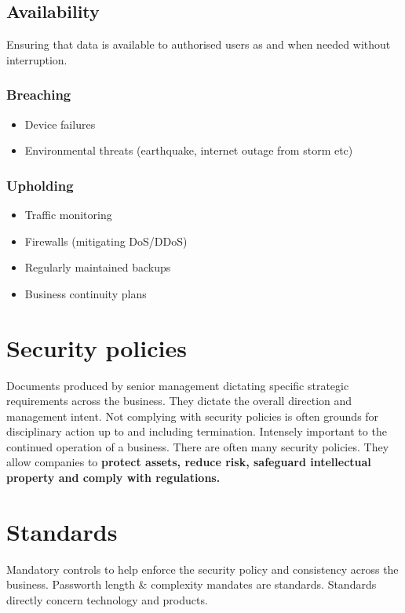 \documentclass[12pt]{report}
\begin{document}
\subsection{Availability}
Ensuring that data is available to authorised users as and when needed without interruption.
\begin{multicols}{2}
\subsubsection{Breaching}
\begin{itemize}
	\item Device failures
	\item Environmental threats (earthquake, internet outage from storm etc)
\end{itemize}
\subsubsection{Upholding}
\begin{itemize}
	\item Traffic monitoring
	\item Firewalls (mitigating DoS/DDoS)
	\item Regularly maintained backups
	\item Business continuity plans
\end{itemize}
\end{multicols}
\pagebreak

\section{Security policies}
Documents produced by senior management dictating specific strategic requirements across the business. They dictate the overall direction and management intent. 
Not complying with security policies is often grounds for disciplinary action up to and including termination. Intensely important to the continued operation of a business.
There are often many security policies. They allow companies to \textbf{protect assets, reduce risk, safeguard intellectual property and comply with regulations.}

\section{Standards}
Mandatory controls to help enforce the security policy and consistency across the business. Passworth length \& complexity mandates are standards.
Standards directly concern technology and products.
\end{document}
